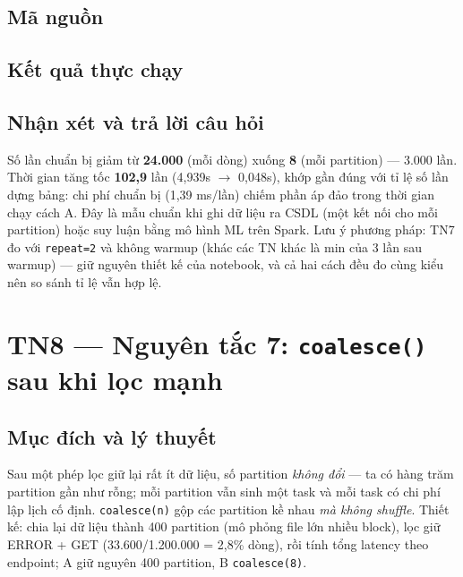 \documentclass[12pt,a4paper,oneside]{article}
\begin{document}
\subsection{Mã nguồn}



\subsection{Kết quả thực chạy}



\subsection{Nhận xét và trả lời câu hỏi}

Số lần chuẩn bị giảm từ \textbf{24.000} (mỗi dòng) xuống \textbf{8} (mỗi partition) --- 3.000 lần. Thời gian tăng tốc \textbf{102,9} lần (4,939s $\to$ 0,048s), khớp gần đúng với tỉ lệ số lần dựng bảng: chi phí chuẩn bị (1,39 ms/lần) chiếm phần áp đảo trong thời gian chạy cách A. Đây là mẫu chuẩn khi ghi dữ liệu ra CSDL (một kết nối cho mỗi partition) hoặc suy luận bằng mô hình ML trên Spark. Lưu ý phương pháp: TN7 đo với \texttt{repeat=2} và không warmup (khác các TN khác là min của 3 lần sau warmup) --- giữ nguyên thiết kế của notebook, và cả hai cách đều đo cùng kiểu nên so sánh tỉ lệ vẫn hợp lệ.

\section{TN8 --- Nguyên tắc 7: \texttt{coalesce()} sau khi lọc mạnh}
\label{sec:tn8}

\subsection{Mục đích và lý thuyết}

Sau một phép lọc giữ lại rất ít dữ liệu, số partition \emph{không đổi} --- ta có hàng trăm partition gần như rỗng; mỗi partition vẫn sinh một task và mỗi task có chi phí lập lịch cố định. \texttt{coalesce(n)} gộp các partition kề nhau \emph{mà không shuffle}. Thiết kế: chia lại dữ liệu thành 400 partition (mô phỏng file lớn nhiều block), lọc giữ ERROR + GET (33.600/1.200.000 = 2,8\% dòng), rồi tính tổng latency theo endpoint; A giữ nguyên 400 partition, B \texttt{coalesce(8)}.
\end{document}
